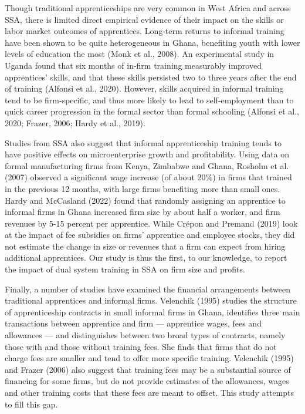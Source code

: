 \documentclass[
  11pt,
a4paper
]{article}
\begin{document}
Though traditional apprenticeships are very common in West Africa and across SSA, there is limited direct empirical evidence of their impact on the skills or labor market outcomes of apprentices. Long-term returns to informal training have been shown to be quite heterogeneous in Ghana, benefiting youth with lower levels of education the most (Monk et al., 2008). An experimental study in Uganda found that six months of in-firm training measurably improved apprentices' skills, and that these skills persisted two to three years after the end of training (Alfonsi et al., 2020). However, skills acquired in informal training tend to be firm-specific, and thus more likely to lead to self-employment than to quick career progression in the formal sector than formal schooling (Alfonsi et al., 2020; Frazer, 2006; Hardy et al., 2019).

Studies from SSA also suggest that informal apprenticeship training tends to have positive effects on microenterprise growth and profitability. Using data on formal manufacturing firms from Kenya, Zimbabwe and Ghana, Rosholm et al. (2007) observed a significant wage increase (of about 20\%) in firms that trained in the previous 12 months, with large firms benefiting more than small ones. Hardy and McCasland (2022) found that randomly assigning an apprentice to informal firms in Ghana increased firm size by about half a worker, and firm revenues by 5-15 percent per apprentice. While Crépon and Premand (2019) look at the impact of fee subsidies on firms' apprentice and employee stocks, they did not estimate the change in size or revenues that a firm can expect from hiring additional apprentices. Our study is thus the first, to our knowledge, to report the impact of dual system training in SSA on firm size and profits.

Finally, a number of studies have examined the financial arrangements between traditional apprentices and informal firms. Velenchik (1995) studies the structure of apprenticeship contracts in small informal firms in Ghana, identifies three main transactions between apprentice and firm --- apprentice wages, fees and allowances --- and distinguishes between two broad types of contracts, namely those with and those without training fees. She finds that firms that do not charge fees are smaller and tend to offer more specific training. Velenchik (1995) and Frazer (2006) also suggest that training fees may be a substantial source of financing for some firms, but do not provide estimates of the allowances, wages and other training costs that these fees are meant to offset. This study attempts to fill this gap.
\end{document}
